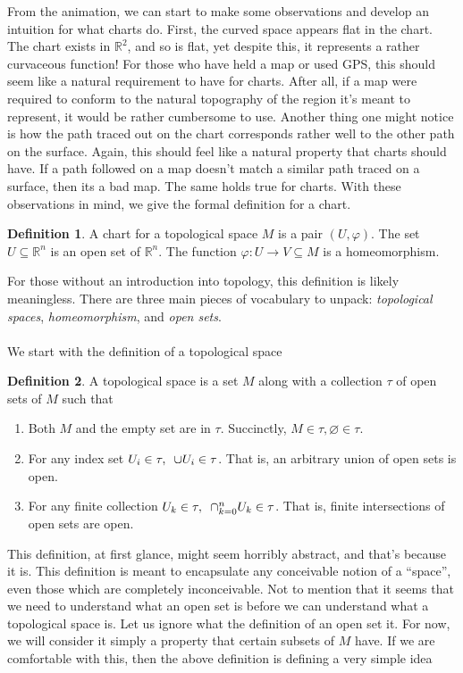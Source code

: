 \documentclass[]{article}
\let\emptyset\varnothing %
\let\phi\varphi %
\newcommand\<{\ensuremath{\left\langle}}
\renewcommand\>{\ensuremath{\right\rangle}}
\newcommand{\RR}{\ensuremath{\mathbb{R}}}
\theoremstyle{definition}
\newtheorem{definition}{Definition}[section]
\theoremstyle{definition}
\begin{document}
	From the animation, we can start to make some observations and develop an intuition for what charts do. First, the curved space appears flat in the chart. The chart exists in $\RR^2$, and so is flat, yet despite this, it represents a rather curvaceous function! For those who have held a map or used GPS, this should seem like a natural requirement to have for charts. After all, if a map were required to conform to the natural topography of the region it's meant to represent, it would be rather cumbersome to use. Another thing one might notice is how the path traced out on the chart corresponds rather well to the other path on the surface. Again, this should feel like a natural property that charts should have. If a path followed on a map doesn't match a similar path traced on a surface, then its a bad map. The same holds true for charts. With these observations in mind, we give the formal definition for a chart.
	\begin{definition}
		A chart for a topological space $M$ is a pair $(U, \phi)$. The set $U \subseteq \RR^n$ is an open set of $\RR^n$. The function $\phi : U \to V \subseteq M$ is a homeomorphism.
	\end{definition}
	For those without an introduction into topology, this definition is likely meaningless. There are three main pieces of vocabulary to unpack: \textit{topological spaces}, \textit{homeomorphism}, and \textit{open sets}. \\
	\\
	We start with the definition of a topological space
	\begin{definition}
		A topological space is a set $M$ along with a collection $\tau$ of open sets of $M$ such that
		\begin{enumerate}[1.]
				\item Both $M$ and the empty set are in $\tau$. Succinctly, $M \in \tau, \emptyset \in \tau$.
				\item For any index set $U_i \in \tau, \hspace*{5px}\cup U_i \in \tau$. That is, an arbitrary union of open sets is open.
				\item For any finite collection $U_k \in \tau, \hspace*{5px}\cap^n_{k=0} U_k \in \tau$. That is, finite intersections of open sets are open.
		\end{enumerate}
	\end{definition}
	This definition, at first glance, might seem horribly abstract, and that's because it is. This definition is meant to encapsulate any conceivable notion of a ``space'', even those which are completely inconceivable. Not to mention that it seems that we need to understand what an open set is before we can understand what a topological space is. Let us ignore what the definition of an open set it. For now, we will consider it simply a property that certain subsets of $M$ have. If we are comfortable with this, then the above definition is defining a very simple idea
\end{document}
